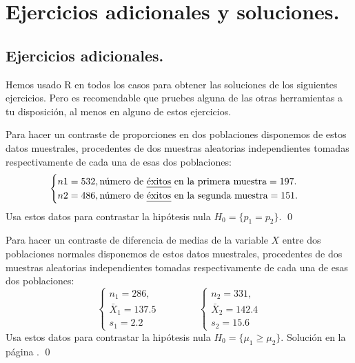 \documentclass[10pt,a4paper]{article}\usepackage[]{graphicx}\usepackage[]{color}
\newcounter {cont01}
\begin{document}
{%
%


\section{Ejercicios adicionales y soluciones.}
\label{tut09:sec:EjerciciosAdicionalesYSoluciones}

\subsection*{Ejercicios adicionales.}
\label{tut09:subsec:EjerciciosAdicionales}

Hemos usado R en todos los casos para obtener las soluciones de los siguientes ejercicios. Pero es recomendable que pruebes alguna de las otras herramientas a tu disposición, al menos en alguno de estos ejercicios.

\begin{ejercicio}
\label{tut09:ejercicio06}

Para hacer un contraste de proporciones en dos poblaciones disponemos de estos datos muestrales, procedentes de dos muestras aleatorias independientes tomadas respectivamente de cada una de esas dos poblaciones:
\[
\begin{cases}
n1=532, \mbox{número de {\em éxitos} en la primera muestra} = 197.\\
n2=486, \mbox{número de {\em éxitos} en la segunda muestra} = 151.\\
\end{cases}
\]
Usa estos datos para contrastar la hipótesis nula $H_0=\{p_1 = p_2\}$.
\qed
\end{ejercicio}

\begin{ejercicio}
\label{tut09:ejercicio07}








Para hacer un contraste de diferencia de medias de la variable $X$ entre dos poblaciones normales disponemos de estos datos muestrales, procedentes de dos muestras aleatorias independientes tomadas respectivamente de cada una de esas dos poblaciones:
\[
\begin{cases}
n_1 = 286,\\
{\bar X}_1 = 137.5\\
s_1 = 2.2
\end{cases}
\qquad\qquad
\begin{cases}
n_2 = 331,\\
{\bar X}_2 = 142.4\\
s_2 = 15.6
\end{cases}
\]
Usa estos datos para contrastar la hipótesis nula $H_0=\{\mu_1 \geq \mu_2 \}$.
Solución en la página \pageref{tut09:ejercicio07:sol}.
\qed
\end{ejercicio}


}
\end{document}
